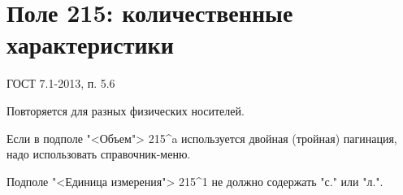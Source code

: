 \chapter{Поле 215: количественные характеристики}

ГОСТ 7.1-2013, п. 5.6

Повторяется для разных физических носителей.

Если в подполе "<Объем"> 215\^{}a используется двойная (тройная) пагинация, надо использовать справочник-меню.

Подполе "<Единица измерения"> 215\^{}1 не должно содержать "с." или "л.".
